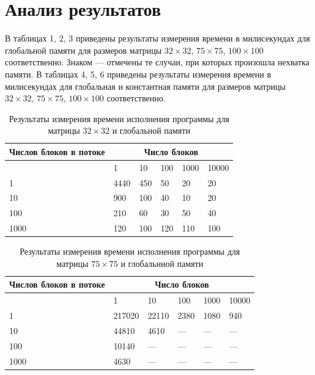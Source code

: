 \documentclass[a4paper, final]{article}
\begin{document}
\newpage
\section{Анализ результатов}

В таблицах 1, 2, 3 приведены результаты измерения времени в милисекундах для глобальной памяти для размеров матрицы $32 \times 32$, $75 \times 75$, $100 \times 100$ соответственно. Знаком --- отмечены те случаи, при которых произошла нехватка памяти. В таблицах 4, 5, 6 приведены результаты измерения времени в милисекундах для глобальная и константная памяти для размеров матрицы $32 \times 32$, $75 \times 75$, $100 \times 100$ соответственно.

\begin{table}[H]
    \centering
    \caption{Результаты измерения времени исполнения программы для матрицы $32 \times 32$ и глобальной памяти}
    \footnotesize
    \begin{tabularx}{\textwidth}{|X|X|X|X|X|X|}
    \hline
    \textbf{Числов блоков в потоке} & \multicolumn{5}{|c|}{\textbf{Число блоков}} \\ 
    \hline
    &  1&	10&	100&	1000&	10000 \\
    \hline
    1 & 4440	& 450	& 50 & 	20 & 	20\\
    \hline
    10 & 	900 &	100 &	40 &	10 &	20\\
    \hline
    100	& 210 & 60	& 30	& 50	& 40\\
    \hline
    1000 &	120 &	100	& 120 &	110 & 	100\\
    \hline
    \end{tabularx}
\end{table}

\begin{table}[H]
    \centering
    \caption{Результаты измерения времени исполнения программы для матрицы $75 \times 75$ и глобальнной памяти}
    \footnotesize
    \begin{tabularx}{\textwidth}{|X|X|X|X|X|X|}
    \hline
    \textbf{Числов блоков в потоке} & \multicolumn{5}{|c|}{\textbf{Число блоков}} \\ 
    \hline
    &  1&	10&	100&	1000&	10000 \\
    \hline
    1	& 217020	& 22110	& 2380& 	1080	& 940\\
    \hline
    10	& 44810	& 4610	&---	&---	&---\\
    \hline
    100&	10140&	---	&---&	---&	---\\
    \hline
    1000&	4630&	---&	---&	---&	---\\
    \hline
    \end{tabularx}
\end{table}
\end{document}
